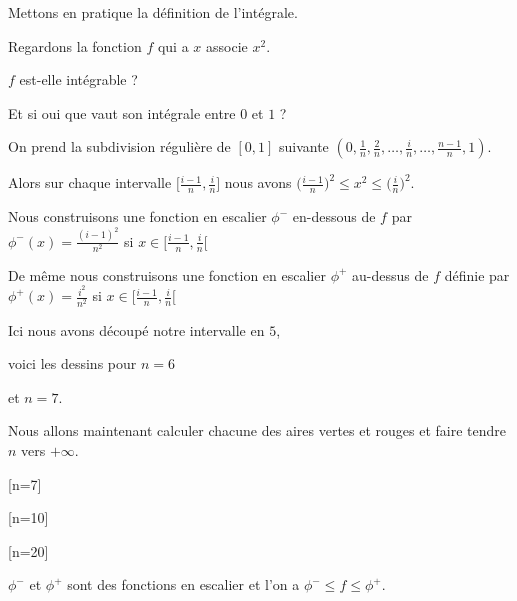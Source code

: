 \diapo

Mettons en pratique la définition de l'intégrale.

Regardons la fonction $f$ qui a $x$ associe $x^2$.

\change

$f$ est-elle intégrable ? 

\change

Et si oui que vaut son intégrale entre $0$ et $1$ ?


\change

On prend la subdivision régulière de $[0,1]$ suivante
$(0,\frac1n,\frac2n,\ldots,\frac in,\ldots, \frac{n-1}{n},1)$.


\change


Alors sur chaque intervalle $\big[\frac{i-1}{n},\frac in\big]$ nous avons
$\big(\tfrac{i-1}{n}\big)^2 \le x^2 \le \big(\tfrac in\big)^2$.


\change

Nous construisons une fonction en escalier $\phi^-$ en-dessous de $f$  par 
$\phi^-(x) = \frac{(i-1)^2}{n^2}$ si $x \in \big[\frac{i-1}{n},\frac in\big[$

\change

De même nous construisons une fonction en escalier $\phi^+$ au-dessus de $f$ définie
par $\phi^+(x) = \frac{i^2}{n^2}$ si $x \in \big[\frac{i-1}{n},\frac in\big[$

\change 

Ici nous avons découpé notre intervalle en $5$, 

\change

voici les dessins pour $n=6$ 

\change

et $n=7$.



\diapo


Nous allons maintenant calculer chacune des aires vertes et rouges
et faire tendre $n$ vers $+\infty$.

[n=7]

\change

[n=10]

\change

[n=20]

\change


\change


$\phi^-$ et $\phi^+$ sont des fonctions en escalier et l'on a $\phi^- \le f \le \phi^+$.

